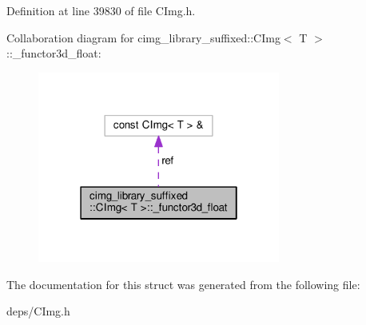 Definition at line 39830 of file C\+Img.\+h.



Collaboration diagram for cimg\+\_\+library\+\_\+suffixed\+:\+:C\+Img$<$ T $>$\+:\+:\+\_\+functor3d\+\_\+float\+:
\nopagebreak
\begin{figure}[H]
\begin{center}
\leavevmode
\includegraphics[width=226pt]{d2/de7/structcimg__library__suffixed_1_1CImg_1_1__functor3d__float__coll__graph}
\end{center}
\end{figure}


The documentation for this struct was generated from the following file\+:\begin{DoxyCompactItemize}
\item 
deps/C\+Img.\+h\end{DoxyCompactItemize}
